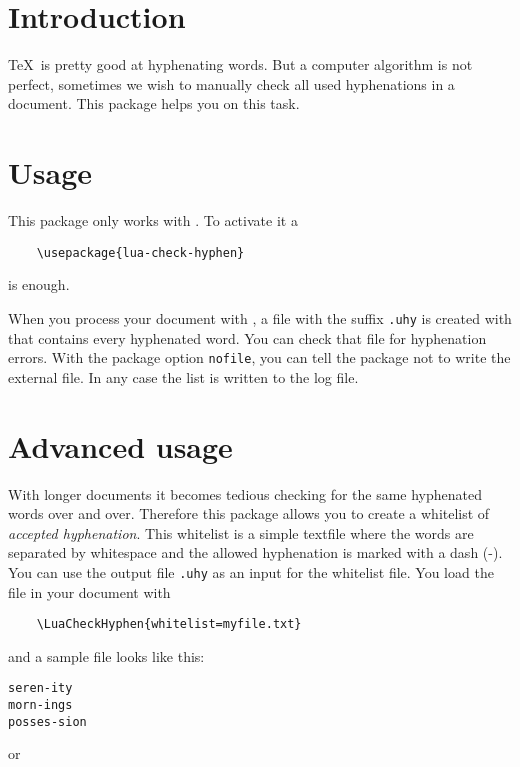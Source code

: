 \documentclass{ltxdockit}
\begin{document}
\printtitlepage
\tableofcontents

\section{Introduction}

\TeX\ is pretty good at hyphenating words. But a computer algorithm is not perfect, sometimes we wish to manually check all used hyphenations in a document. This package helps you on this task.

\section{Usage}

This package only works with \LuaTeX. To activate it a

\begin{verbatim}
	\usepackage{lua-check-hyphen}
\end{verbatim}
is enough.

When you process your document with \LuaLaTeX, a file with the suffix \verb|.uhy| is created with that contains every hyphenated word. You can check that file for hyphenation errors. With the package option \texttt{nofile}, you can tell the package not to write the external file. In any case the list is written to the log file.

\section{Advanced usage}
\label{sec:advanced_usage}

With longer documents it becomes tedious checking for the same hyphenated words over and over. Therefore this package allows you to create a whitelist of \emph{accepted hyphenation}. This whitelist is a simple textfile where the words are separated by whitespace and the allowed hyphenation is marked with a dash (-). You can use the output file \texttt{.uhy} as an input for the whitelist file. You load the file in your document with

\begin{verbatim}
	\LuaCheckHyphen{whitelist=myfile.txt}
\end{verbatim}

and a sample file looks like this:

\begin{verbatim}
seren-ity
morn-ings
posses-sion
\end{verbatim}

or
\end{document}
